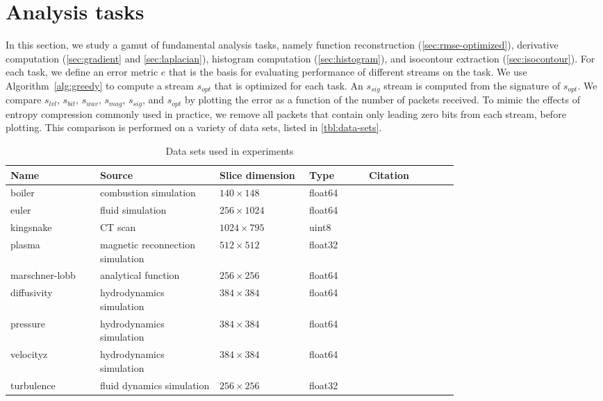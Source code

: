 \section{Analysis tasks}\label{sec:analysis-tasks}

In this section, we study a gamut of fundamental analysis tasks, namely function reconstruction
(\autoref{sec:rmse-optimized}), derivative computation (\autoref{sec:gradient} and
\autoref{sec:laplacian}), histogram computation (\autoref{sec:histogram}), and isocontour extraction
(\autoref{sec:isocontour}). For each task, we define an error metric $e$ that is the basis for
evaluating performance of different streams on the task. We use Algorithm~\ref{alg:greedy} to
compute a stream $s_{opt}$ that is optimized for each task. An $s_{sig}$ stream is computed from the
signature of $s_{opt}$. We compare $s_{lvl}$, $s_{bit}$, $s_{wav}$, $s_{mag}$, $s_{sig}$, and
$s_{opt}$ by plotting the error as a function of the number of packets received. To mimic the
effects of entropy compression commonly used in practice, we remove all packets that contain only
leading zero bits from each stream, before plotting. This comparison is performed on a variety of
data sets, listed in \autoref{tbl:data-sets}.

\begin{table*}[t]
  \caption{Data sets used in experiments }
  \centering
  \begin{tabular}{p{0.15\linewidth}p{0.20\linewidth}p{0.15\linewidth}p{0.10\linewidth}p{0.15\linewidth}}
  \hline
  Name & Source & Slice dimension & Type & Citation\\
  \hline
  boiler & combustion simulation& $140\times 148$ & float64 &\\
  euler & fluid simulation& $256\times 1024$ & float64 &\\
  kingsnake & CT scan & $1024\times 795$ & uint8 &\\
  plasma & magnetic reconnection simulation& $512\times 512$ & float32 &\\
  marschner-lobb & analytical function& $256\times 256$ & float64 &\\
  diffusivity & hydrodynamics simulation& $384\times 384$ & float64 &\\
  pressure & hydrodynamics simulation& $384\times 384$ & float64 &\\
  velocityz & hydrodynamics simulation& $384\times 384$ & float64 &\\
  turbulence & fluid dynamics simulation& $256\times 256$ & float32 &\\
  \hline
  \end{tabular}
\label{tbl:data-sets}
\end{table*}


